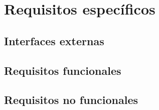 \chapter{Requisitos espec\'ificos}
\section{Interfaces externas}
\section{Requisitos funcionales}

\section{Requisitos no funcionales}